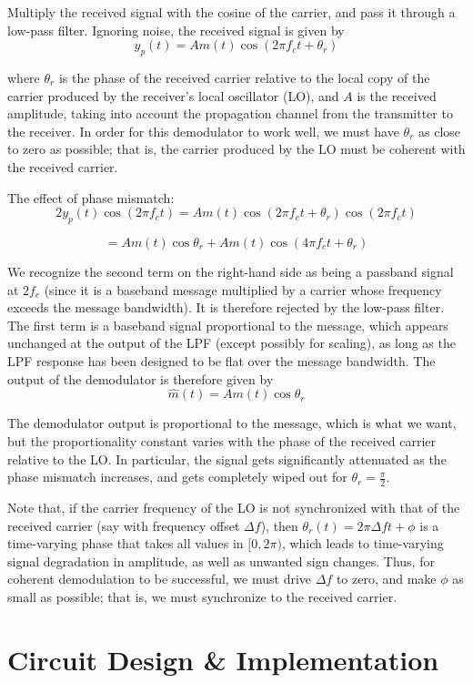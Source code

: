 \documentclass[conference]{IEEEtran}
\begin{document}
Multiply the received signal with the cosine of the carrier, and pass it through a low-pass filter. Ignoring noise, the received signal is given by
\[
    y_p(t) = A m(t) \cos(2\pi f_c t + \theta_r)
\]

where \(\theta_r\) is the phase of the received carrier relative to the local copy of the carrier produced by the receiver’s local oscillator (LO), and \(A\) is the received amplitude, taking into account the propagation channel from the transmitter to the receiver. In order for this demodulator to work well, we must have \(\theta_r\) as close to zero as possible; that is, the carrier produced by the LO must be coherent with the received carrier.

The effect of phase mismatch:
\[
    2y_p(t) \cos(2\pi f_c t) = A m(t) \cos(2\pi f_c t + \theta_r) \cos(2\pi f_c t)
\]

\[
=A m(t) \cos\theta_r + A m(t) \cos(4\pi f_c t + \theta_r)
\]

We recognize the second term on the right-hand side as being a passband signal at \(2f_c\) (since it is a baseband message multiplied by a carrier whose frequency exceeds the message bandwidth). It is therefore rejected by the low-pass filter. The first term is a baseband signal proportional to the message, which appears unchanged at the output of the LPF (except possibly for scaling), as long as the LPF response has been designed to be flat over the message bandwidth. The output of the demodulator is therefore given by
\[
    \hat{m}(t) = A m(t) \cos\theta_r 
\]

The demodulator output is proportional to the message, which is what we want, but the proportionality constant varies with the phase of the received carrier relative to the LO. In particular, the signal gets significantly attenuated as the phase mismatch increases, and gets completely wiped out for \(\theta_r = \frac{\pi}{2}\).

Note that, if the carrier frequency of the LO is not synchronized with that of the received carrier (say with frequency offset \(\Delta f\)), then \(\theta_r(t) = 2\pi \Delta f t + \phi\) is a time-varying phase that takes all values in \([0, 2\pi)\), which leads to time-varying signal degradation in amplitude, as well as unwanted sign changes. Thus, for coherent demodulation to be successful, we must drive \(\Delta f\) to zero, and make \(\phi\) as small as possible; that is, we must synchronize to the received carrier.




\section{Circuit Design \& Implementation}
\end{document}
